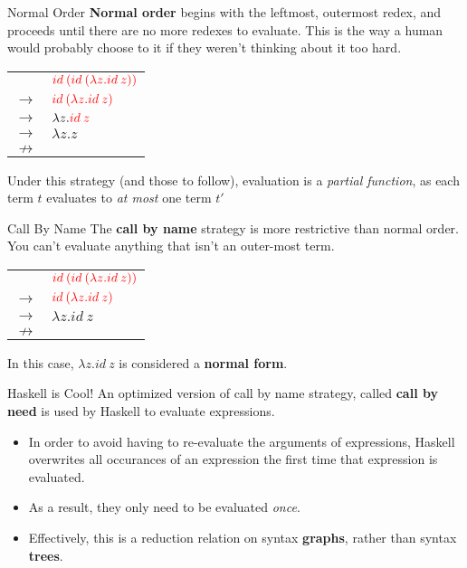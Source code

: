 \documentclass[11pt]{beamer}
\begin{document}
\begin{frame}[fragile=singleslide]{Normal Order}
\textbf{Normal order} begins with the leftmost, outermost redex, and proceeds until there are no more redexes to evaluate. This is the way a human would probably choose to it if they weren't thinking about it too hard. \\
\vspace{1em}
\begin{center}
\begin{tabular}{c l}
& ${\color{red} id\:(id\:(\lambda z. id\:z))}$ \\ 
$\rightarrow$ & ${\color{red} id\:(\lambda z. id\:z)}$ \\ 
$\rightarrow$ & $\lambda z. {\color{red} id\:z}$ \\
$\rightarrow$ & $\lambda z. z$ \\
$\nrightarrow$ &  \\
\end{tabular}
\end{center}
Under this strategy (and those to follow), evaluation is a \emph{partial function}, as each term $t$ evaluates to \emph{at most} one term $t'$
\end{frame}

\begin{frame}[fragile=singleslide]{Call By Name}
The \textbf{call by name} strategy is more restrictive than normal order.  You can't evaluate anything that isn't an outer-most term.  \\
\vspace{1em}
\begin{center}
\begin{tabular}{c l}
& ${\color{red} id\:(id\:(\lambda z. id\:z))}$ \\ 
$\rightarrow$ & ${\color{red} id\:(\lambda z. id\:z)}$ \\ 
$\rightarrow$ & $\lambda z. id\:z$ \\
$\nrightarrow$ &  \\
\end{tabular}
\end{center}
In this case, $\lambda z. id\:z$ is considered a \textbf{normal form}.  

\end{frame}

\begin{frame}[fragile=singleslide]{Haskell is Cool!}
An optimized version of call by name strategy, called \textbf{call by need} is used by Haskell to evaluate expressions.  
\begin{itemize}
\item In order to avoid having to re-evaluate the arguments of expressions, Haskell overwrites all occurances of an expression the first time that expression is evaluated.  
\item As a result, they only need to be evaluated \emph{once}.
\item Effectively, this is a reduction relation on syntax \textbf{graphs}, rather than syntax \textbf{trees}.
\end{itemize}

\end{frame}
\end{document}
